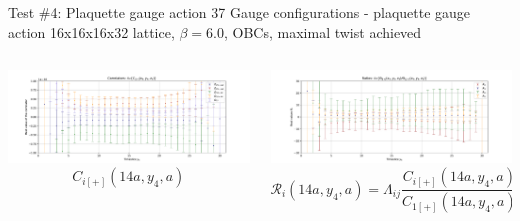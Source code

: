 \documentclass{beamer}
\begin{document}
\begin{frame}{Test \#4: Plaquette gauge action}
      37 Gauge configurations - plaquette gauge action\newline
      16x16x16x32 lattice, $\beta = 6.0$, OBCs, maximal twist achieved
      \begin{columns}
            \begin{column}{.5\textwidth}
                  \includegraphics[width=\textwidth]{../thesis-tex/imgs-MSc-thesis/plaq-3pts.pdf}
                  $$C_{i[+]}(14a,y_4,a)$$
            \end{column}
            \begin{column}{.5\textwidth}
                  \includegraphics[width=\textwidth]{../thesis-tex/imgs-MSc-thesis/ratios.pdf}
                  $$\mathcal{R}_i (14a,y_4,a) = \Lambda_{ij}\frac{C_{i[+]}(14a,y_4,a)}{C_{1[+]}(14a,y_4,a)}$$
            \end{column}
      \end{columns}
\end{frame}
\end{document}
